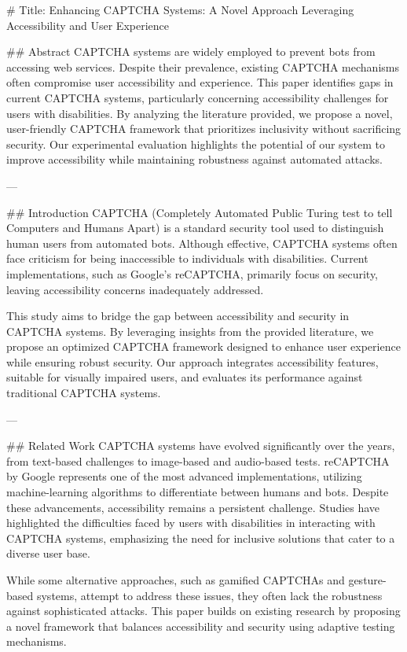 # Title: Enhancing CAPTCHA Systems: A Novel Approach Leveraging Accessibility and User Experience

## Abstract
CAPTCHA systems are widely employed to prevent bots from accessing web services. Despite their prevalence, existing CAPTCHA mechanisms often compromise user accessibility and experience. This paper identifies gaps in current CAPTCHA systems, particularly concerning accessibility challenges for users with disabilities. By analyzing the literature provided, we propose a novel, user-friendly CAPTCHA framework that prioritizes inclusivity without sacrificing security. Our experimental evaluation highlights the potential of our system to improve accessibility while maintaining robustness against automated attacks.

---

## Introduction
CAPTCHA (Completely Automated Public Turing test to tell Computers and Humans Apart) is a standard security tool used to distinguish human users from automated bots. Although effective, CAPTCHA systems often face criticism for being inaccessible to individuals with disabilities. Current implementations, such as Google's reCAPTCHA, primarily focus on security, leaving accessibility concerns inadequately addressed.

This study aims to bridge the gap between accessibility and security in CAPTCHA systems. By leveraging insights from the provided literature, we propose an optimized CAPTCHA framework designed to enhance user experience while ensuring robust security. Our approach integrates accessibility features, suitable for visually impaired users, and evaluates its performance against traditional CAPTCHA systems.

---

## Related Work
CAPTCHA systems have evolved significantly over the years, from text-based challenges to image-based and audio-based tests. reCAPTCHA by Google represents one of the most advanced implementations, utilizing machine-learning algorithms to differentiate between humans and bots. Despite these advancements, accessibility remains a persistent challenge. Studies have highlighted the difficulties faced by users with disabilities in interacting with CAPTCHA systems, emphasizing the need for inclusive solutions that cater to a diverse user base.

While some alternative approaches, such as gamified CAPTCHAs and gesture-based systems, attempt to address these issues, they often lack the robustness against sophisticated attacks. This paper builds on existing research by proposing a novel framework that balances accessibility and security using adaptive testing mechanisms.

